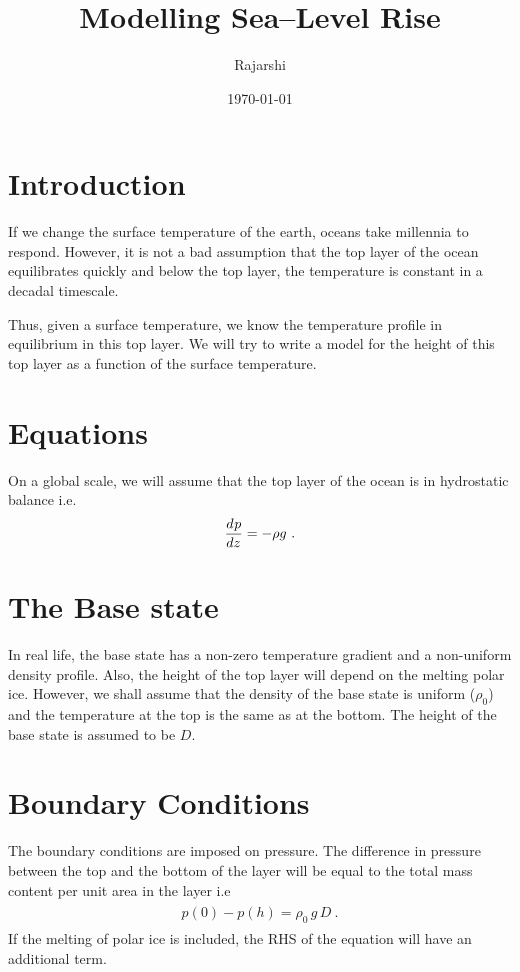 \documentclass[fontsize = 13pt]{scrartcl}
\title{Modelling Sea--Level Rise}
\author{Rajarshi}
\date{\today}
\begin{document}
\maketitle
\tableofcontents
\pagebreak
\section{Introduction}
If we change the surface temperature of the earth, oceans take millennia to respond. However, it is not a bad assumption that the top layer of the ocean equilibrates quickly and below the top layer, the temperature is constant in a decadal timescale.

Thus, given a surface temperature, we know the temperature profile in equilibrium in this top layer. We will try to write a model for the height of this top layer as a function of the surface temperature. 

\section{Equations}
On a global scale, we will assume that the top layer of the ocean is in hydrostatic balance i.e.
\begin{align}
\begin{split}
    \frac{d^{} p}{d z^{}} = - \rho g \ .
\end{split}
\end{align}
\section{The Base state}
In real life, the base state has a non-zero temperature gradient and a non-uniform density profile. Also, the height of the top layer will depend on the melting polar ice. 
However, we shall assume that the density of the base state is uniform (\(\rho_0\)) and the temperature at the top is the same as at the bottom. The height of the base state is assumed to be \(D\).
\section{Boundary Conditions}
The boundary conditions are imposed on pressure. The difference in pressure between the top and the bottom of the layer will be equal to the total mass content per unit area in the layer i.e 
\begin{align}
\begin{split}
    p(0) - p(h) = \rho_0\,g\,D \ .
\end{split}
\end{align}
If the melting of polar ice is included, the RHS of the equation will have an additional term.
\end{document}
